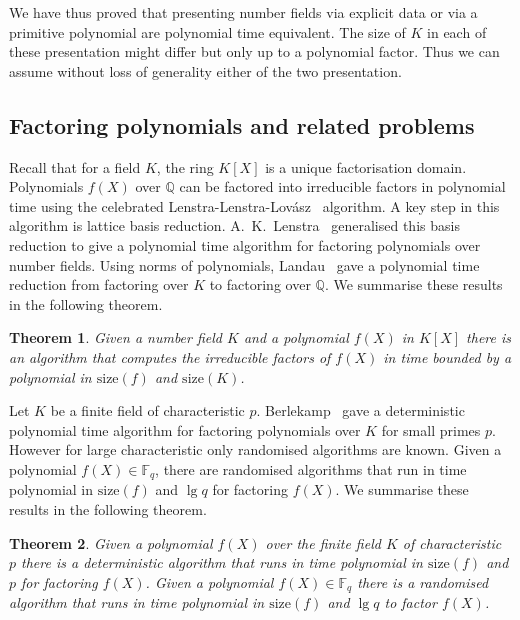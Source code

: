 \documentclass[11pt]{madras}%
\newtheorem{theorem}{Theorem}[chapter]
\theoremstyle{remark}
\newcommand{\size}[1]{{\ensuremath{\mathrm{size}\left(#1\right)}}}
\begin{document}
We have thus proved that presenting number fields via explicit data or
via a primitive polynomial are polynomial time equivalent. The size of
$K$ in each of these presentation might differ but only up to a
polynomial factor. Thus we can assume without loss of generality
either of the two presentation.



\subsection{Factoring polynomials and related problems}



Recall that for a field $K$, the ring $K[X]$ is a unique factorisation
domain. Polynomials $f(X)$ over $\mathbb{Q}$ can be factored into
irreducible factors in polynomial time using the celebrated
Lenstra-Lenstra-Lov\'asz~\cite{lll} algorithm.  A key step in this
algorithm is lattice basis reduction.
A.~K.~Lenstra~\cite{lenstra82factoring} generalised this basis
reduction to give a polynomial time algorithm for factoring
polynomials over number fields. Using norms of polynomials,
Landau~\cite{landau85factoring} gave a polynomial time reduction from
factoring over $K$ to factoring over $\mathbb{Q}$.  We summarise these
results in the following theorem.

\begin{theorem}\label{thm-factoring-numberfield}
  Given a number field $K$ and a polynomial $f(X)$ in $K[X]$ there is
  an algorithm that computes the irreducible factors of $f(X)$ in time
  bounded by a polynomial in $\size{f}$ and $\size{K}$.
\end{theorem}

Let $K$ be a finite field of characteristic $p$.
Berlekamp~\cite{berlekamp67factoring} gave a deterministic polynomial
time algorithm for factoring polynomials over $K$ for small primes
$p$. However for large characteristic only randomised algorithms are
known. Given a polynomial $f(X) \in \mathbb{F}_{q}$, there are
randomised algorithms that run in time polynomial in $\size{f}$ and
$\lg{q}$ \cite{berlekamp70factoring,cantor81factoring} for factoring
$f(X)$.  We summarise these results in the following theorem.

\begin{theorem}\label{thm-factoring-finitefield}
  Given a polynomial $f(X)$ over the finite field $K$ of
  characteristic $p$ there is a deterministic algorithm that runs in
  time polynomial in $\size{f}$ and $p$ for factoring $f(X)$. Given a
  polynomial $f(X) \in \mathbb{F}_q$ there is a randomised algorithm
  that runs in time polynomial in $\size{f}$ and $\lg{q}$ to factor
  $f(X)$.
\end{theorem}
\end{document}
